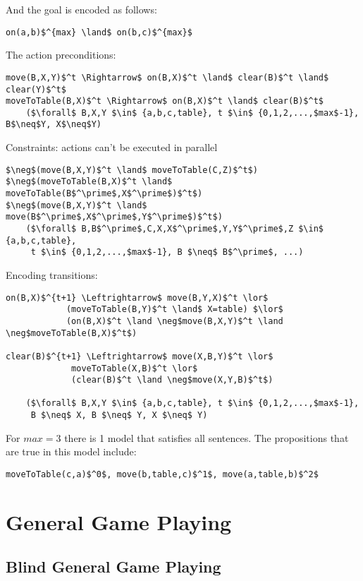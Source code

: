 And the goal is encoded as follows:
\begin{lstlisting}
on(a,b)$^{max} \land$ on(b,c)$^{max}$
\end{lstlisting}

The action preconditions:
\begin{lstlisting}
move(B,X,Y)$^t \Rightarrow$ on(B,X)$^t \land$ clear(B)$^t \land$ clear(Y)$^t$
moveToTable(B,X)$^t \Rightarrow$ on(B,X)$^t \land$ clear(B)$^t$
    ($\forall$ B,X,Y $\in$ {a,b,c,table}, t $\in$ {0,1,2,...,$max$-1}, B$\neq$Y, X$\neq$Y)
\end{lstlisting}

Constraints: actions can't be executed in parallel
\begin{lstlisting}
$\neg$(move(B,X,Y)$^t \land$ moveToTable(C,Z)$^t$)
$\neg$(moveToTable(B,X)$^t \land$ moveToTable(B$^\prime$,X$^\prime$)$^t$)
$\neg$(move(B,X,Y)$^t \land$ move(B$^\prime$,X$^\prime$,Y$^\prime$)$^t$)
    ($\forall$ B,B$^\prime$,C,X,X$^\prime$,Y,Y$^\prime$,Z $\in$ {a,b,c,table},
     t $\in$ {0,1,2,...,$max$-1}, B $\neq$ B$^\prime$, ...)
\end{lstlisting}

Encoding transitions:
\begin{lstlisting}
on(B,X)$^{t+1} \Leftrightarrow$ move(B,Y,X)$^t \lor$
            (moveToTable(B,Y)$^t \land$ X=table) $\lor$
            (on(B,X)$^t \land \neg$move(B,X,Y)$^t \land \neg$moveToTable(B,X)$^t$)

clear(B)$^{t+1} \Leftrightarrow$ move(X,B,Y)$^t \lor$
             moveToTable(X,B)$^t \lor$
             (clear(B)$^t \land \neg$move(X,Y,B)$^t$)

    ($\forall$ B,X,Y $\in$ {a,b,c,table}, t $\in$ {0,1,2,...,$max$-1},
     B $\neq$ X, B $\neq$ Y, X $\neq$ Y)
\end{lstlisting}

For $max=3$ there is 1 model that satisfies all sentences. The propositions
that are true in this model include:
\begin{lstlisting}
moveToTable(c,a)$^0$, move(b,table,c)$^1$, move(a,table,b)$^2$
\end{lstlisting}

\chapter{General Game Playing}
\section{Blind General Game Playing}
